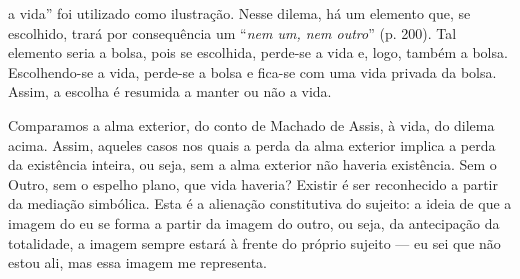 \begin{multicols}{2}
a vida” foi utilizado como ilustração.\allowbreak{} Nesse dilema,\allowbreak{} há um elemento que,\allowbreak{} se escolhido,\allowbreak{} trará por consequência um “\textit{nem um,\allowbreak{} nem outro}” (\allowbreak{}p.\allowbreak{} 200)\allowbreak{}.\allowbreak{} Tal elemento seria a bolsa,\allowbreak{} pois se escolhida,\allowbreak{} perde-\allowbreak{}se a vida e,\allowbreak{} logo,\allowbreak{} também a bolsa.\allowbreak{} Escolhendo-\allowbreak{}se a vida,\allowbreak{} perde-\allowbreak{}se a bolsa e fica-\allowbreak{}se com uma vida privada da bolsa.\allowbreak{} Assim,\allowbreak{} a escolha é resumida a manter ou não a vida.\allowbreak{}\par{}Comparamos a alma exterior,\allowbreak{} do conto de Machado de Assis,\allowbreak{} à vida,\allowbreak{} do dilema acima.\allowbreak{} Assim,\allowbreak{} aqueles casos nos quais a perda da alma exterior implica a perda da existência inteira,\allowbreak{} ou seja,\allowbreak{} sem a alma exterior não haveria existência.\allowbreak{} Sem o Outro,\allowbreak{} sem o espelho plano,\allowbreak{} que vida haveria? Existir é ser reconhecido a partir da mediação simbólica.\allowbreak{} Esta é a alienação constitutiva do sujeito:\allowbreak{} a ideia de que a imagem do eu se forma a partir da imagem do outro,\allowbreak{} ou seja,\allowbreak{} da antecipação da totalidade,\allowbreak{} a imagem sempre estará à frente do próprio sujeito — eu sei que não estou ali,\allowbreak{} mas essa imagem me representa.\allowbreak{}

\end{multicols}
